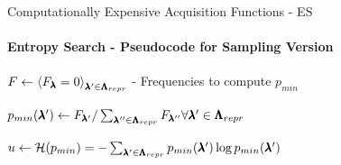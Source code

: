 \begin{frame}[c]{Computationally Expensive Acquisition Functions - ES}
\framesubtitle{Entropy Search - Pseudocode for Sampling Version}

\begin{center}
\begin{minipage}{0.75\textwidth}
\begin{algorithm}[H]
    \LinesNumbered
    \SetAlgoLined
    \setcounter{AlgoLine}{0}
    
    
    $F\leftarrow{\langle F_{\pmb{\lambda}} = 0 \rangle}_{\pmb{\lambda}'\in\pmb{\Lambda}_{repr}}$ - Frequencies to compute $p_{min}$\;
    

    $p_{min}(\pmb{\lambda}') \leftarrow F_{\pmb{\lambda}'} / \sum_{\pmb{\lambda}'' \in \pmb{\Lambda}_{repr}} F_{\pmb{\lambda}''} \forall{\pmb{\lambda}' \in \pmb{\Lambda}_{repr}} $ \;
    
    $u\leftarrow\mathcal{H}(p_{min}) = - \sum_{\pmb{\lambda}' \in \pmb{\Lambda}_{repr}} p_{min}(\pmb{\lambda}') \log p_{min}(\pmb{\lambda}')$\;

    \caption{Sampling Based Entropy Search Acquisition Function}
\end{algorithm}
\end{minipage}
\end{center}

\end{frame}
